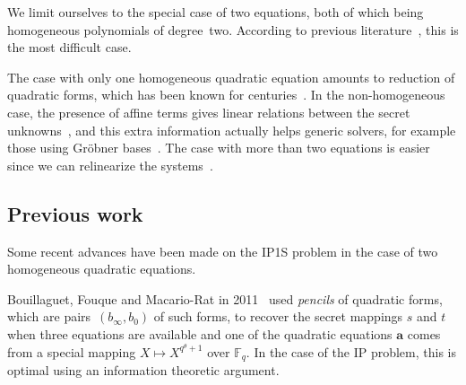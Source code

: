 \documentclass{article}%
\def\F{\mathbb{F}}
\begin{document}
We limit ourselves to the special case of two equations, both of which
being homogeneous polynomials of degree~two. According to previous
literature~\cite{DBLP:conf/eurocrypt/Perret05,DBLP:conf/eurocrypt/FaugereP06,DBLP:conf/pkc/BouillaguetFFP11,DBLP:conf/eurocrypt/BouillaguetFV13},
this is the most difficult case.

The case with only one homogeneous quadratic equation amounts to 
reduction of quadratic forms, which has been known for
centuries~\cite{gauss,lidl1997finite}. In the non-homogeneous case, the
presence of affine terms gives linear relations between the secret
unknowns~\cite{DBLP:conf/eurocrypt/PatarinGC98}, and this extra
information actually helps generic solvers, for example those using
Gröbner bases~\cite{DBLP:conf/eurocrypt/FaugereP06}.
The case with more than two equations is easier since we can relinearize
the systems~\cite{DBLP:conf/pkc/BouillaguetFFP11}.

\subsection*{Previous work}%

Some recent advances have been made on the IP1S problem in the case of
two
homogeneous quadratic equations.


Bouillaguet, Fouque and Macario-Rat
in 2011~\cite{DBLP:conf/asiacrypt/BouillaguetFM11} 
used \emph{pencils} of quadratic forms,
which are pairs~$(b_{∞}, b_0)$ of such forms,
to recover the secret mappings $s$ and $t$ when three equations are available
and one of the quadratic equations $\bm{a}$
comes from a special mapping $X\mapsto X^{q^\theta+1}$ over $\F_q$.
In the case of the IP problem,
this is optimal using an information theoretic argument.
\end{document}
